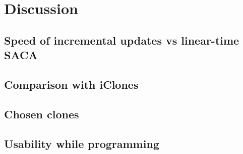 \chapter{Discussion}

\section{Speed of incremental updates vs linear-time SACA}

\section{Comparison with iClones}

\section{Chosen clones}

\section{Usability while programming}

